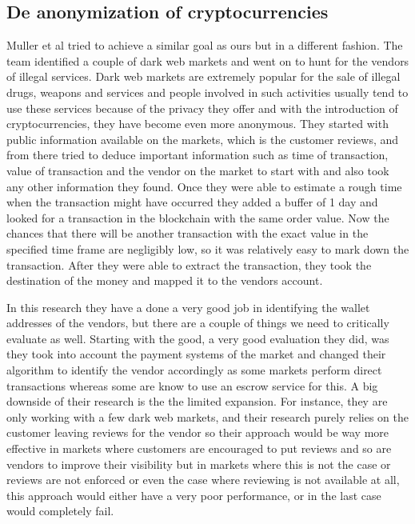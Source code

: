 \documentclass{article}
\begin{document}
\subsection{De anonymization of cryptocurrencies}
Muller et al \cite{muller} tried to achieve a similar goal as ours but in a different fashion. The team identified a couple of dark web markets and went on to hunt for the vendors of illegal services. Dark web markets are extremely popular for the sale of illegal drugs, weapons and services and people involved in such activities usually tend to use these services because of the privacy they offer and with the introduction of cryptocurrencies, they have become even more anonymous. They started with public information available on the markets, which is the customer reviews, and from there tried to deduce important information such as time of transaction, value of transaction and the vendor on the market to start with and also took any other information they found. Once they were able to estimate a rough time when the transaction might have occurred they added a buffer of 1 day and looked for a transaction in the blockchain with the same order value. Now the chances that there will be another transaction with the exact value in the specified time frame are negligibly low, so it was relatively easy to mark down the transaction. After they were able to extract the transaction, they took the destination of the money and mapped it to the vendors account.

In this research they have a done a very good job in identifying the wallet addresses of the vendors, but there are a couple of things we need to critically evaluate as well. Starting with the good, a very good evaluation they did, was they took into account the payment systems of the market and changed their algorithm to identify the vendor accordingly as some markets perform direct transactions whereas some are know to use an escrow service \cite{Fig} for this. A big downside of their research is the the limited expansion. For instance, they are only working with a few dark web markets, and their research purely relies on the customer leaving reviews for the vendor so their approach would be way more effective in markets where customers are encouraged to put reviews and so are vendors to improve their visibility but in markets where this is not the case or reviews are not enforced or even the case where reviewing is not available at all, this approach would either have a very poor performance, or in the last case would completely fail. 
\end{document}
